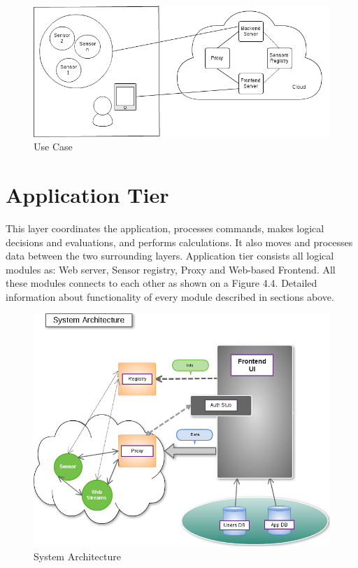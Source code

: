         \begin{figure}[!ht]
        \centering
        \includegraphics[scale=0.5]{images/User_Case.png}   
        \caption[Use Case]{Use Case}
        \label{img:structure}                           
        \end{figure}

\section{Application Tier}
  This layer coordinates the application, processes commands, makes logical decisions and evaluations, and performs calculations. It also moves and processes data between the two surrounding layers.
  \newline
  Application tier consists all logical modules as: Web server, Sensor registry, Proxy and Web-based Frontend. All these modules connects to each other as shown on a Figure 4.4. Detailed information about functionality of every module described in sections above.
    \begin{figure}[!ht]
    \centering
    \includegraphics[scale=0.5]{images/Structure.png}   
    \caption[System Architecture]{System Architecture}
    \label{img:structure}                           
    \end{figure}

